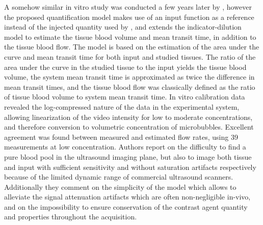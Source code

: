 A somehow similar in vitro study was conducted a few years later by \citet{Heidenreich:1993ji}, however the proposed quantification model makes use of an input function as a reference instead of the injected quantity used by \citet{Bleeker:1990uy}, and extends the indicator-dilution model to estimate the tissue blood volume and mean transit time, in addition to the tissue blood flow. 
The model is based on the estimation of the area under the curve and mean transit time for both input and studied tissues.
The ratio of the area under the curve in the studied tissue to the input yields the tissue blood volume, the system mean transit time is approximated as twice the difference in mean transit times, and the tissue blood flow was classically defined as the ratio of tissue blood volume to system mean transit time.
In vitro calibration data revealed the log-compressed nature of the data in the experimental system, allowing linearization of the video intensity for low to moderate concentrations, and therefore conversion to volumetric concentration of microbubbles.
Excellent agreement was found between measured and estimated flow rates, using 39 measurements at low concentration.
Authors report on the difficulty to find a pure blood pool in the ultrasound imaging plane, but also to image both tissue and input with sufficient sensitivity and without saturation artifacts respectively because of the limited dynamic range of commercial ultrasound scanners.
Additionally they comment on the simplicity of the model which allows to alleviate the signal attenuation artifacts which are often non-negligible in-vivo, and on the impossibility to ensure conservation of the contrast agent quantity and properties throughout the acquisition. 

